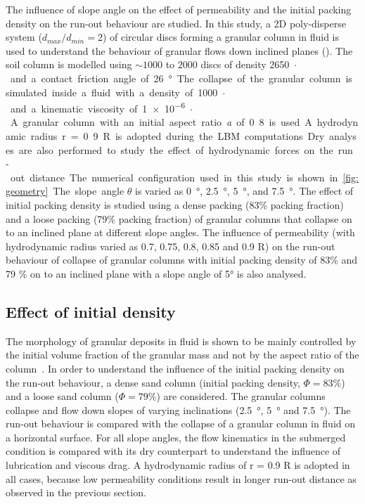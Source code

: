 The influence of slope angle on the effect of permeability and the initial 
packing density on the run-out behaviour are studied. In this study, a 2D 
poly-disperse system ($d_{max}/d_{min} = 2$) of circular discs forming a 
granular column in fluid is used to understand 
the behaviour of granular flows down inclined planes (). 
The soil column is modelled using $\sim 1000$ to $2000$ discs of density 
\SI{2650}{\kg$\cdot$\per\cubic\meter} and a contact friction angle of 
\SI{26}{\degree}. The collapse of the granular column is simulated inside a 
fluid with a density of \SI{1000}{\kg$\cdot$\per\cubic\meter} and a kinematic 
viscosity of \SI{1e-6}{\square\meter$\cdot$\per\second}. A granular column with 
an 
initial aspect ratio \textit{a} of 0.8 is used. A hydrodynamic radius r = 0.9 R 
is adopted during the LBM computations. Dry analyses are also performed to 
study the effect of hydrodynamic forces on the run-out distance. The 
numerical configuration used in this study is shown in~\cref{fig:geometry}. The 
slope angle $\theta$ is varied as \SI{0}{\degree}, \SI{2.5}{\degree}, 
\SI{5}{\degree}, and \SI{7.5}{\degree}. The effect of initial packing density 
is studied using a 
dense packing (83\% packing fraction) and a loose packing (79\% packing 
fraction) of granular columns that collapse on to an inclined plane at 
different slope angles. The influence of permeability (with hydrodynamic radius 
varied as 0.7, 0.75, 0.8, 0.85 and 0.9 R) on the run-out behaviour of collapse 
of granular columns with initial packing density of 83\% and 79 \% on to an 
inclined plane with a slope angle of 5\si{\degree} is also analysed. 


\subsection{Effect of initial density}
The morphology of granular deposits in fluid is shown to be mainly 
controlled by the initial volume fraction of the granular mass and not by the 
aspect ratio of the column~\citep{Rondon2011,Pailha2008}. In order to 
understand the influence of the initial packing density on the run-out 
behaviour, a dense sand column (initial packing density, $\Phi=83\%$) and a 
loose sand column ($\Phi=79\%$) are considered. The granular columns collapse 
and flow down slopes of varying inclinations (\SI{2.5}{\degree}, 
\SI{5}{\degree} and \SI{7.5}{\degree}). The run-out behaviour is compared with 
the collapse of a granular column in fluid on a horizontal surface. For all 
slope angles, the flow kinematics in the submerged condition is compared with 
its dry counterpart to understand the influence of lubrication and viscous 
drag. A hydrodynamic radius of r = 0.9 R is adopted in all cases, because low 
permeability conditions result in longer run-out distance as observed in the 
previous section.


